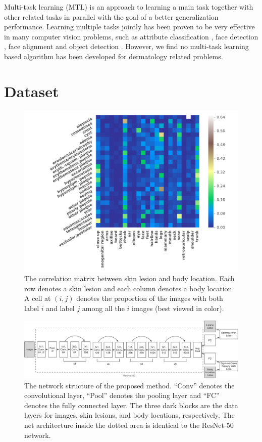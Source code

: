 \documentclass[letterpaper]{article}
\begin{document}
Multi-task learning (MTL) \cite{DBLP:journals/ml/Caruana97} is an approach to
learning a main task together with other related tasks in parallel with the goal 
of a better generalization performance. Learning multiple tasks jointly has been
proven to be very effective in many computer vision problems, such as attribute
classification \cite{DBLP:journals/corr/HandC16}, face detection \cite{DBLP:journals/corr/RanjanPC16},
face alignment \cite{DBLP:journals/pami/ZhangLLT16} and object detection \cite{DBLP:conf/nips/RenHGS15}.
However, we find no multi-task learning based algorithm has been developed for
dermatology related problems.

\section{Dataset}

\begin{figure}
  \centering
  \includegraphics[scale=0.51]{label_correlation.pdf}
  \caption{The correlation matrix between skin lesion and body location. Each row
  denotes a skin lesion and each column denotes a body location. A cell at
  $(i, j)$ denotes the proportion of the images with both label $i$ and 
  label $j$ among all the $i$ images (best viewed in color).}
  \label{fig: correlation}
\end{figure}

\begin{figure}[!ht]
  \centering
  \includegraphics[scale=0.36]{architecture.pdf}
  \caption{The network structure of the proposed method. ``Conv'' denotes the
  convolutional layer, ``Pool'' denotes the pooling layer and ``FC'' denotes the
  fully connected layer. The three dark blocks are the data layers for images,
  skin lesions, and body locations, respectively. The net architecture inside
  the dotted area is identical to the ResNet-50 network.
  }
  \label{fig: architecture}
\end{figure}
\end{document}

